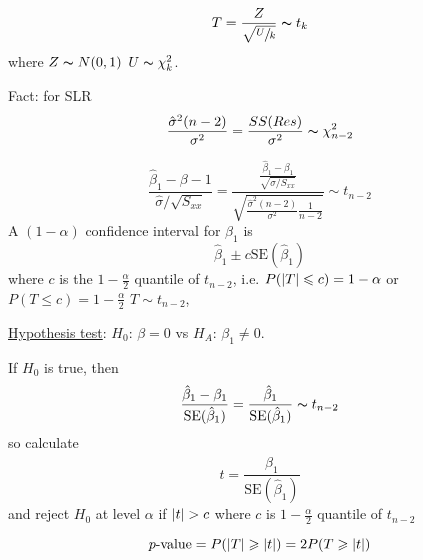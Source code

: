 \[ T=\frac{Z}{\sqrt{\sfrac{U}{k}}} \thicksim t_k \]
where $ Z \thicksim N(0,1) $ $ U \thicksim \chi^2_k $.

Fact: for SLR
\[ \frac{\hat{\sigma}^2(n-2)}{\sigma^2}=\frac{SS(Res)}{\sigma^2}
    \thicksim \chi^2_{n-2}  \]

\[ \frac{\hat{\beta}_1-\beta-1}{\hat{\sigma}/\sqrt{S_{xx}}}
    =\frac{\frac{\hat{\beta}_1-\beta_1}{\sqrt{\sigma/S_{xx}}}}{
    \sqrt{\frac{\hat{\sigma}^2(n-2)}{\sigma^2}\frac{1}{n-2}}
    } \sim t_{n-2}  \]
A $ (1-\alpha) $ confidence interval for $ \beta_1 $ is
\[ \hat{\beta}_1\pm c\text{SE}(\hat{\beta}_1) \]
where $ c $ is the $ 1-\frac{\alpha}{2} $ quantile
of $ t_{n-2} $, i.e. $ P(\lvert T\rvert\leqslant c)=1-\alpha $
or $ P(T\leqslant c)=1-\frac{\alpha}{2} $ $ T \sim t_{n-2} $,

\underline{Hypothesis test}: $ H_0 $: $ \beta=0 $ vs $ H_A $: $ \beta_1\neq 0 $.

If $ H_0 $ is true, then
\[ \frac{\hat{\beta}_1-\beta_1}{\text{SE}(\hat{\beta}_1)}
    =\frac{\hat{\beta}_1}{\text{SE}(\hat{\beta}_1)} \thicksim t_{n-2}   \]
so calculate
\[ t=\frac{\hat{\beta}_1}{\text{SE}(\hat{\beta}_1)}  \]
and reject $ H_0 $ at level $ \alpha $ if $ \lvert t\rvert>c $
where $ c $ is $ 1-\frac{\alpha}{2} $ quantile of $ t_{n-2} $

\[ p\text{-value}=P(\lvert T\rvert\geqslant \lvert t\rvert)
    =2P(T\geqslant \lvert t\rvert) \]
